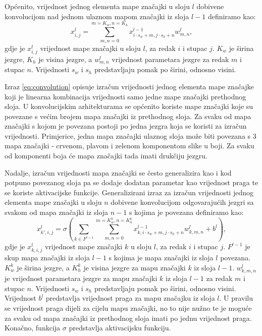 \documentclass[times, utf8, diplomski, numeric]{fer}
\begin{document}
Općenito, vrijednost jednog elementa mape značajki u sloju $l$ dobivene konvolucijom nad jednom ulaznom mapom značajki iz sloja $l-1$ definiramo kao:
\begin{equation}
 x^l_{i,j}=\sum_{m,n=0}^{m=K_w,n=K_h}x^{l-1}_{i \cdot s_w +m, j \cdot s_h +n} w^l_{m, n}, \label{eq:convolution}
\end{equation}
gdje je $x_{i,j}^l$ vrijednost mape značajki u sloju $l$, za redak $i$ i stupac $j$. $K_w$ je širina jezgre, $K_h$ je visina jezgre, a $w^l_{m,n}$ vrijednost parametara jezgre za redak $m$ i stupac $n$.
Vrijednosti $s_w$ i $s_h$ predstavljaju pomak po širini, odnosno visini.

Izraz \ref{eq:convolution} opisuje izračun vrijednosti jednog elementa mape značajke koji je linearna kombinacija vrijednosti samo jedne mape značajki prethodnog sloja.
U konvolucijskim arhitekturama se općenito koriste mape značajki koje su povezane s većim brojem mapa značajki iz prethodnog sloja.
Za svaku od mapa značajki s kojom je povezana postoji po jedna jezgra koja se koristi za izračun vrijednosti.
Primjerice, jedna mapa značajki ulaznog sloja može biti povezana s 3 mapa značajki - crvenom, plavom i zelenom komponentom slike u boji.
Za svaku od komponenti boja će mapa značajki tada imati drukčiju jezgru.

Nadalje, izračun vrijednosti mapa značajki se često generalizira kao i kod potpuno povezanog sloja pa se dodaje dodatan parametar kao vrijednost praga te se koriste aktivacijske funkcije.
Generalizirani izraz za izračun vrijednosti jednog elementa mape značajki u sloju $n$ dobivene konvolucijom odgovarajućih jezgri sa svakom od mapa značajki iz sloja $n-1$ s kojima je povezana definiramo kao:
\begin{equation}
 x^l_{k',i,j}=\sigma\left(\sum_{k\in F^{l-1}}\sum_{m,n=0}^{m=K_w^k,n=K_h^k}x^{l-1}_{k, i \cdot s_w +m, j \cdot s_h +n} w^l_{k, m, n} + b^l\right), \label{eq:generalized_convolution}
\end{equation}
gdje je $x_{k,i,j}^l$ vrijednost mape značajki $k$ u sloju $l$, za redak $i$ i stupac $j$. 
$F^{l-1}$ je skup mapa značajki iz sloja $l-1$ s kojima je mapa značajki iz sloja $l$ povezana. 
$K_w^k$ je širina jezgre, a $K_h^k$ je visina jezgre za mapu značajki $k$ iz sloja $l-1$. 
$w^l_{k, m, n}$ je vrijednost parametara jezgre za mapu značajki $k$ iz sloja $l-1$ za redak $m$ i stupac $n$.
Vrijednosti $s_w$ i $s_h$ predstavljaju pomak po širini, odnosno visini.
Vrijednost $b^l$ predstavlja vrijednost praga za mapu značajku iz sloja $l$. 
U pravilu se vrijednost praga dijeli za cijelu mapu značajki, no to nije nužno te je moguće za svaku od mapa značajki iz prethodnog sloja imati po jednu vrijednost praga.
Konačno, funkcija $\sigma$ predstavlja aktivacijsku funkciju.
\end{document}
